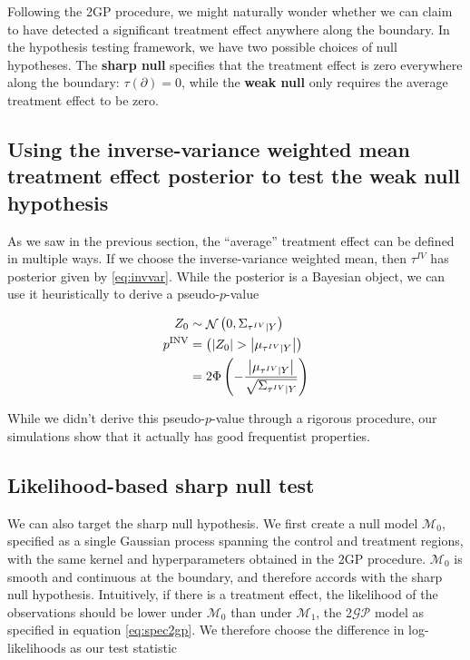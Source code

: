 \documentclass[letter]{article}
\newcommand{\genericdel}[3]{%
      \left#1#3\right#2
    }
\newcommand{\del}[1]{\genericdel(){#1}}
\let\Pr\relax
\DeclareMathOperator{\Pr}{\mathbb{P}}
\DeclareMathOperator{\normal}{\mathcal{N}}
\newcommand{\abs}[1]{\genericdel||{#1}}
\newcommand{\gp}{\mathcal{GP}}
\newcommand{\boundary}{\partial}
\newcommand{\invvar}{\tau^{IV}}
\newcommand{\modnull}{\mathscr{M}_0}
\newcommand{\modalt}{\mathscr{M}_1}
\begin{document}
Following the 2GP procedure, we might naturally wonder whether we can
claim to have detected a significant treatment effect anywhere along the
boundary. In the hypothesis testing framework, we have two possible
choices of null hypotheses. The \textbf{sharp null} specifies that the
treatment effect is zero everywhere along the boundary:
\(\tau(\boundary)=0\), while the \textbf{weak null} only requires the
average treatment effect to be zero.

\subsection{Using the inverse-variance weighted mean treatment effect
posterior to test the weak null
hypothesis}\label{using-the-inverse-variance-weighted-mean-treatment-effect-posterior-to-test-the-weak-null-hypothesis}

As we saw in the previous section, the ``average'' treatment effect can
be defined in multiple ways. If we choose the inverse-variance weighted
mean, then \(\invvar\) has posterior given by \eqref{eq:invvar}. While
the posterior is a Bayesian object, we can use it heuristically to
derive a pseudo-\(p\)-value

\begin{equation}
\begin{split}
    Z_0 &\sim \normal\del{0, \Sigma_{\invvar \mid Y}}  \\
    p^{\mathrm{INV}} &= \Pr\del{ 
        \abs{Z_0} > 
        \abs{
            \mu_{
                \invvar \mid Y
            }
        } 
    } \\
    &= 2\Phi\del{-
        \frac{
            \abs{
                \mu_{
                    \invvar \mid Y
                }
            }
        }{
            \sqrt{
                \Sigma_{\invvar \mid Y}
            }
        }
    }
\end{split}
\end{equation}

While we didn't derive this pseudo-\(p\)-value through a rigorous
procedure, our simulations show that it actually has good frequentist
properties.
    


    	\subsection{Likelihood-based sharp null
test}\label{likelihood-based-sharp-null-test}

We can also target the sharp null hypothesis. We first create a null
model \(\modnull\), specified as a single Gaussian process spanning the
control and treatment regions, with the same kernel and hyperparameters
obtained in the 2GP procedure. \(\modnull\) is smooth and continuous at
the boundary, and therefore accords with the sharp null hypothesis.
Intuitively, if there is a treatment effect, the likelihood of the
observations should be lower under \(\modnull\) than under \(\modalt\),
the 2\(\gp\) model as specified in equation \eqref{eq:spec2gp}. We
therefore choose the difference in log-likelihoods as our test statistic
\end{document}
